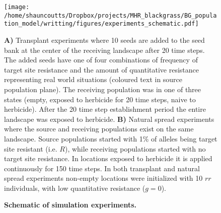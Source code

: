 \documentclass[10pt,letterpaper]{article}
\begin{document}
\newpage
\begin{figure}[!h] 
	\texttt{[image: /home/shauncoutts/Dropbox/projects/MHR\_blackgrass/BG\_population\_model/writting/figures/experiments\_schematic.pdf]}
\caption{\bf Schematic of simulation experiments.} {\bf A)} Transplant experiments where 10 seeds are added to the seed bank at the center of the receiving landscape after 20 time steps. The added seeds have one of four combinations of frequency of target site resistance and the amount of quantitative resistance representing real world situations (coloured text in source population plane). The receiving population was in one of three states (empty, exposed to herbicide for 20 time steps, naive to herbicide). After the 20 time step establishment period the entire landscape was exposed to herbicide. {\bf B)} Natural spread experiments where the source and receiving populations exist on the same landscape. Source populations started with 1\% of alleles being target site resistant (i.e. $R$), while receiving populations started with no target site resistance. In locations exposed to herbicide it is applied continuously for 150 time steps. In both transplant and natural spread experiments non-empty locations were initialized with 10 $rr$ individuals, with low quantitative resistance ($g = 0$). 
\label{fig:exper}
\end{figure}

\end{document}
